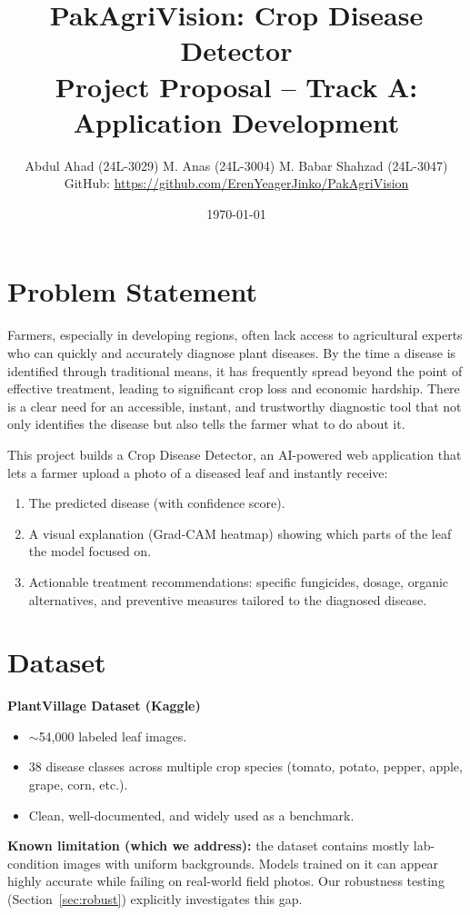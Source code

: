 \documentclass[11pt,a4paper]{article}
\title{\textbf{PakAgriVision: Crop Disease Detector}\\[4pt]\large Project Proposal -- Track A: Application Development}
\author{
  Abdul Ahad (24L-3029) \quad M. Anas (24L-3004) \quad M. Babar Shahzad (24L-3047)\\[4pt]
  GitHub: \url{https://github.com/ErenYeagerJinko/PakAgriVision}
}
\date{\today}
\begin{document}
\maketitle

\section{Problem Statement}
Farmers, especially in developing regions, often lack access to agricultural experts who can quickly and accurately diagnose plant diseases. By the time a disease is identified through traditional means, it has frequently spread beyond the point of effective treatment, leading to significant crop loss and economic hardship. There is a clear need for an accessible, instant, and trustworthy diagnostic tool that not only identifies the disease but also tells the farmer what to do about it.

This project builds a Crop Disease Detector, an AI-powered web application that lets a farmer upload a photo of a diseased leaf and instantly receive:
\begin{enumerate}
  \item The predicted disease (with confidence score).
  \item A visual explanation (Grad-CAM heatmap) showing which parts of the leaf the model focused on.
  \item Actionable treatment recommendations: specific fungicides, dosage, organic alternatives, and preventive measures tailored to the diagnosed disease.
\end{enumerate}

\section{Dataset}
\textbf{PlantVillage Dataset (Kaggle)}
\begin{itemize}
  \item $\sim$54,000 labeled leaf images.
  \item 38 disease classes across multiple crop species (tomato, potato, pepper, apple, grape, corn, etc.).
  \item Clean, well-documented, and widely used as a benchmark.
\end{itemize}
\textbf{Known limitation (which we address):} the dataset contains mostly lab-condition images with uniform backgrounds. Models trained on it can appear highly accurate while failing on real-world field photos. Our robustness testing (Section~\ref{sec:robust}) explicitly investigates this gap.
\end{document}
